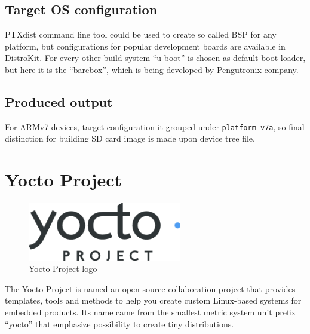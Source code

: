 \documentclass[printmode]{mgr}
\begin{document}
\subsection*{Target OS configuration}

PTXdist command line tool could be used to create so called BSP for any platform, but configurations for popular development boards are available in DistroKit.
For every other build system ``u-boot'' is chosen as default boot loader, but here it is the ``barebox'', which is being developed by Pengutronix company.

\subsection*{Produced output}

For ARMv7 devices, target configuration it grouped under \verb|platform-v7a|, so final distinction for building SD card image is made upon device tree file.





\section{Yocto Project}

\begin{figure}[htbp]
  \centering
    \includegraphics[width=0.6\textwidth]{yoctoproject-logo.png}
    \caption{Yocto Project logo}
  \label{fig:yoctoproject-logo}
\end{figure}

The Yocto Project is named an open source collaboration project that provides templates, tools and methods to help you create custom Linux-based systems for embedded products. Its name came from the smallest metric system unit prefix ``yocto'' that emphasize possibility to create tiny distributions.
\end{document}
